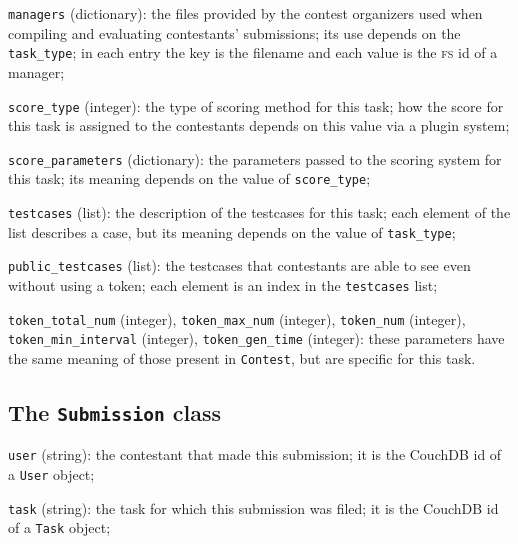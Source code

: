 \documentclass[a4paper,8pt]{amsart}
\newcommand{\FS}{\textsc{fs}}
\newenvironment{squishlist}{%
  \begin{list}{\textbullet}%
    { \setlength{\itemsep}{0pt}%
      \setlength{\parsep}{3pt}%
      \setlength{\topsep}{3pt}%
      \setlength{\partopsep}{0pt}%
      \setlength{\leftmargin}{1.5em}%
      \setlength{\labelwidth}{1em}%
      \setlength{\labelsep}{0.5em} }%
}{\end{list}}
\newcommand{\id}[1]{\texttt{#1}}
\begin{document}
\begin{multicols}{2}
\begin{squishlist}
  \item \id{managers} (dictionary): the files provided by the contest
    organizers used when compiling and evaluating contestants'
    submissions; its use depends on the \id{task\_type}; in each entry
    the key is the filename and each value is the \FS{} id of a
    manager;

  \item \id{score\_type} (integer): the type of scoring method for
    this task; how the score for this task is assigned to the
    contestants depends on this value via a plugin system;

  \item \id{score\_parameters} (dictionary): the parameters passed to
    the scoring system for this task; its meaning depends on the value
    of \id{score\_type};

  \item \id{testcases} (list): the description of the testcases for
    this task; each element of the list describes a case, but its
    meaning depends on the value of \id{task\_type};

  \item \id{public\_testcases} (list): the testcases that contestants
    are able to see even without using a token; each element is an
    index in the \id{testcases} list;

  \item \id{token\_total\_num} (integer), \id{token\_max\_num}
    (integer), \id{token\_num} (integer), \id{token\_min\_interval}
    (integer), \id{token\_gen\_time} (integer): these parameters have
    the same meaning of those present in \id{Contest}, but are
    specific for this task.

  \end{squishlist}

  \subsection{The \id{Submission} class}

  \begin{squishlist}

  \item \id{user} (string): the contestant that made this submission;
    it is the CouchDB id of a \id{User} object;

  \item \id{task} (string): the task for which this submission was
    filed; it is the CouchDB id of a \id{Task} object;


\end{squishlist}
\end{multicols}
\end{document}
